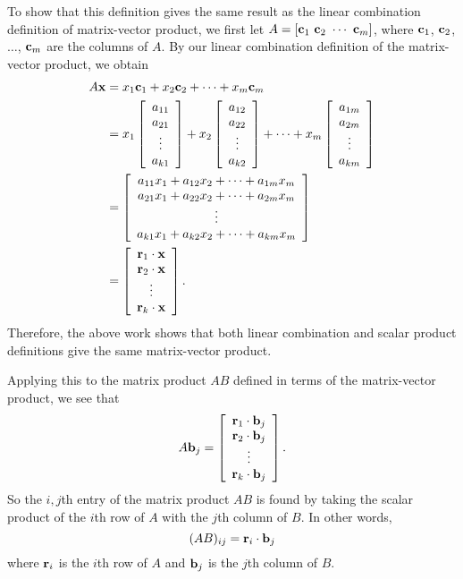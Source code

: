 To show that this definition gives the same result as the linear combination definition of matrix-vector product, we first let $A = [\mathbf{c}_1 \ \mathbf{c}_2 \ \cdots \ \mathbf{c}_m]$, where $\mathbf{c}_1$, $\mathbf{c}_2$, $\ldots$, $\mathbf{c}_m$ are the columns of $A$. By our linear combination definition of the matrix-vector product, we obtain 
\begin{align*}
A \mathbf{x} &= x_1\mathbf{c}_1 + x_2 \mathbf{c}_2 + \cdots + x_m \mathbf{c}_m \\
	&= x_1 \left[ \begin{array}{c} a_{11} \\ a_{21} \\ \vdots \\ a_{k1} \end{array} \right] + x_2 \left[ \begin{array}{c} a_{12} \\ a_{22} \\ \vdots \\ a_{k2} \end{array} \right] + \cdots + x_m \left[ \begin{array}{c} a_{1m} \\ a_{2m} \\ \vdots \\ a_{km} \end{array} \right] \\
	&= \left[ \begin{array}{c} a_{11}x_1+a_{12}x_2+ \cdots + a_{1m}x_m \\ a_{21}x_1+a_{22}x_2+ \cdots + a_{2m}x_m  \\ \vdots \\ a_{k1}x_1+a_{k2}x_2+ \cdots + a_{km}x_m \end{array} \right] \\
	&= \left[ \begin{array}{c} \mathbf{r}_1 \cdot \mathbf{x} \\ \mathbf{r}_2 \cdot \mathbf{x} \\ \vdots \\ \mathbf{r}_k \cdot \mathbf{x} \end{array} \right].
\end{align*}
Therefore, the above work shows that both linear combination and scalar product definitions give the same matrix-vector product.

Applying this to the matrix product $AB$ defined in terms of the matrix-vector product, we see that 
\[A \mathbf{b}_j = \left[ \begin{array}{c} \mathbf{r}_1 \cdot \mathbf{b}_j \\ \mathbf{r}_2 \cdot \mathbf{b}_j \\ \vdots \\ \mathbf{r}_k \cdot \mathbf{b}_j \end{array} \right].\]
So the $i,j$th entry of the matrix product $AB$ is found by taking the scalar product of the $i$th row of $A$ with the $j$th column of $B$. In other words,
\[(AB)_{ij} = \mathbf{r}_i \cdot \mathbf{b}_j\]
where $\mathbf{r}_i$ is the $i$th row of $A$ and $\mathbf{b}_j$ is the $j$th column of $B$.

